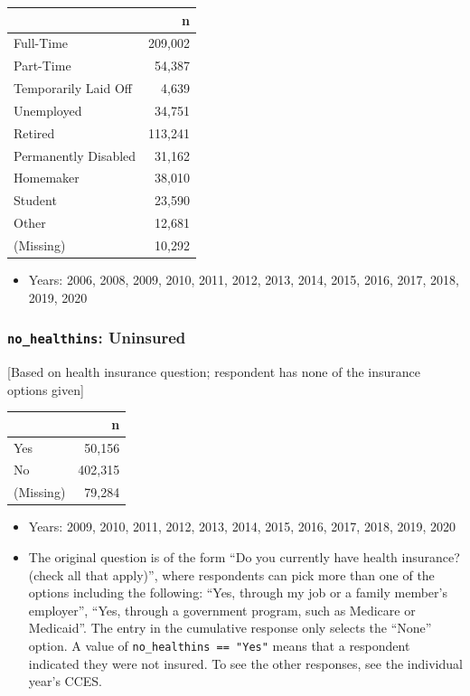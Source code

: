 \documentclass[10pt,article,oneside]{memoir}
\theoremstyle{definition}
\begin{document}
\begin{table}[H]
\centering
\begin{tabular}{lr}
\toprule
 & n\\
\midrule
Full-Time & 209,002\\
Part-Time & 54,387\\
Temporarily Laid Off & 4,639\\
Unemployed & 34,751\\
Retired & 113,241\\
Permanently Disabled & 31,162\\
Homemaker & 38,010\\
Student & 23,590\\
Other & 12,681\\
(Missing) & 10,292\\
\bottomrule
\end{tabular}
\end{table}

\begin{itemize}
\tightlist
\item
  Years: 2006, 2008, 2009, 2010, 2011, 2012, 2013, 2014, 2015, 2016,
  2017, 2018, 2019, 2020
\end{itemize}

\hypertarget{no_healthins-uninsured}{%
\subsubsection{\texorpdfstring{\texttt{no\_healthins}:
Uninsured}{no\_healthins: Uninsured}}\label{no_healthins-uninsured}}

{[}Based on health insurance question; respondent has none of the
insurance options given{]}

\begin{table}[H]
\centering
\begin{tabular}{lr}
\toprule
 & n\\
\midrule
Yes & 50,156\\
No & 402,315\\
(Missing) & 79,284\\
\bottomrule
\end{tabular}
\end{table}

\begin{itemize}
\tightlist
\item
  Years: 2009, 2010, 2011, 2012, 2013, 2014, 2015, 2016, 2017, 2018,
  2019, 2020
\item
  The original question is of the form ``Do you currently have health
  insurance? (check all that apply)'', where respondents can pick more
  than one of the options including the following: ``Yes, through my job
  or a family member's employer'', ``Yes, through a government program,
  such as Medicare or Medicaid''. The entry in the cumulative response
  only selects the ``None'' option. A value of
  \texttt{no\_healthins\ ==\ "Yes"} means that a respondent indicated
  they were not insured. To see the other responses, see the individual
  year's CCES.
\end{itemize}
\end{document}
